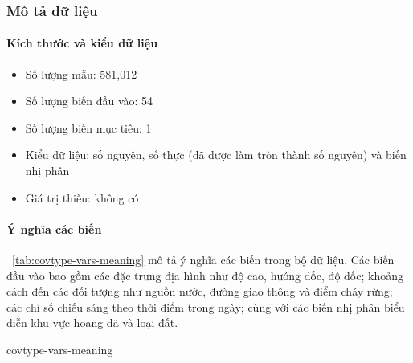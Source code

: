 \subsubsection{Mô tả dữ liệu}

\paragraph{Kích thước và kiểu dữ liệu}

\begin{itemize}
  \item Số lượng mẫu: 581,012
  \item Số lượng biến đầu vào: 54
  \item Số lượng biến mục tiêu: 1
  \item Kiểu dữ liệu: số nguyên, số thực (đã được làm tròn thành số nguyên) và
    biến nhị phân
  \item Giá trị thiếu: không có
\end{itemize}

\paragraph{Ý nghĩa các biến}

\tablename~\ref{tab:covtype-vars-meaning} mô tả ý nghĩa các biến trong bộ dữ
liệu. Các biến đầu vào bao gồm các đặc trưng địa hình như độ cao, hướng dốc,
độ dốc; khoảng cách đến các đối tượng như nguồn nước, đường giao thông và điểm
cháy rừng; các chỉ số chiếu sáng theo thời điểm trong ngày; cùng với các biến
nhị phân biểu diễn khu vực hoang dã và loại đất.

\begin{table}[htbp]
  \centering
  \caption{Mô tả các biến trong bộ dữ liệu Forest CoverType}
  \label{tab:covtype-vars-meaning}
  {covtype-vars-meaning}
\end{table}
